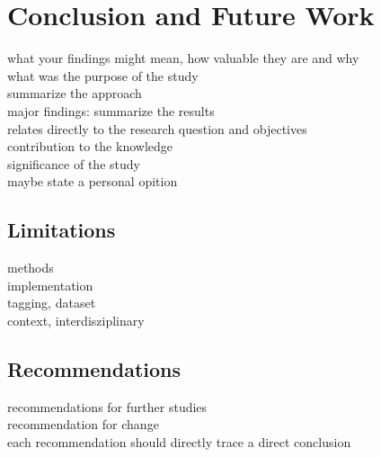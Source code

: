 \chapter{Conclusion and Future Work}
\label{ch:conclusion}

what your findings might mean, how valuable they are and why\\
what was the purpose of the study\\
summarize the approach\\
major findings: summarize the results\\


relates directly to the research question and objectives\\
contribution to the knowledge\\
significance of the study\\
maybe state a personal opition\\

\section{Limitations}
methods\\
implementation\\
tagging, dataset\\
context, interdisziplinary\\

\section{Recommendations}
recommendations for further studies\\
recommendation for change\\
each recommendation should directly trace a direct conclusion\\